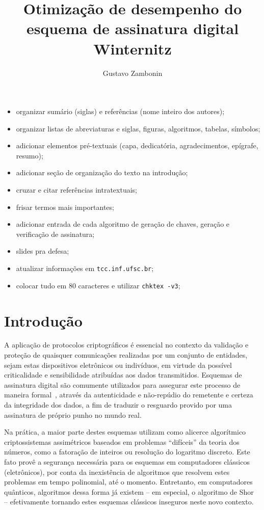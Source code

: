 \documentclass[12pt]{report}
\title{
  Otimização de desempenho do esquema de assinatura digital Winternitz
}
\author{Gustavo Zambonin}
\date{}
\begin{document}
\maketitle

\tableofcontents

\newpage

{\large
\begin{itemize}
    \item organizar sumário (siglas) e referências (nome inteiro dos autores);
    \item organizar listas de abreviaturas e siglas, figuras, algoritmos, tabelas, símbolos;
    \item adicionar elementos pré-textuais (capa, dedicatória, agradecimentos, epígrafe, resumo);
    \item adicionar seção de organização do texto na introdução;
    \item cruzar e citar referências intratextuais;
    \item frisar termos mais importantes;
    \item adicionar entrada de cada algoritmo de geração de chaves, geração e verificação de assinatura;
    \item slides pra defesa;
    \item atualizar informações em \texttt{tcc.inf.ufsc.br};
    \item colocar tudo em 80 caracteres e utilizar \texttt{chktex -v3};
\end{itemize}
}

\newpage

\chapter{Introdução}

A aplicação de protocolos criptográficos é essencial no contexto da validação e
proteção de quaisquer comunicações realizadas por um conjunto de entidades,
sejam estas dispositivos eletrônicos ou indivíduos, em virtude da possível
criticalidade e sensibilidade atribuídas aos dados transmitidos. Esquemas de
assinatura digital são comumente utilizados para assegurar este processo de
maneira formal~\cite{Goldreich:2004:FCV:975541}, através da autenticidade e
não-repúdio do remetente e certeza da integridade dos dados, a fim de traduzir
o resguardo provido por uma assinatura de próprio punho no mundo real.

Na prática, a maior parte destes esquemas utilizam como alicerce algorítmico
criptossistemas assimétricos baseados em problemas ``difíceis'' da teoria dos
números, como a fatoração de inteiros ou resolução do logaritmo discreto.
Este fato provê a segurança necessária para os esquemas
em computadores clássicos (eletrônicos), por conta da inexistência de
algoritmos que resolvem estes problemas em tempo polinomial, até o momento.
Entretanto, em computadores quânticos, algoritmos dessa forma já existem -- em
especial, o algoritmo de Shor~\cite{Shor:1997:PAP:264393.264406} --
efetivamente tornando estes esquemas clássicos inseguros neste novo contexto.
\end{document}
